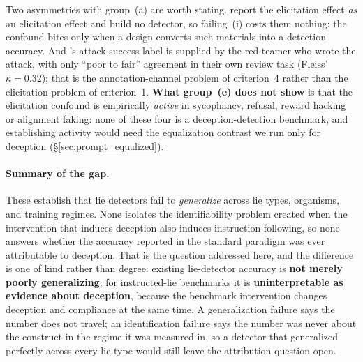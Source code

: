 Two asymmetries with group~(a) are worth stating. \citet{sharma2023sycophancy} report the elicitation effect \emph{as} an elicitation effect and build no detector, so failing~(i) costs them nothing: the confound bites only when a design converts such materials into a detection accuracy. And \citet{ganguli2022red}'s attack-success label is supplied by the red-teamer who wrote the attack, with only ``poor to fair'' agreement in their own review task (Fleiss' $\kappa\!=\!0.32$); that is the annotation-channel problem of criterion~4 rather than the elicitation problem of criterion~1. \textbf{What group~(e) does not show} is that the elicitation confound is empirically \emph{active} in sycophancy, refusal, reward hacking or alignment faking: none of these four is a deception-detection benchmark, and establishing activity would need the equalization contrast we run only for deception (§\ref{sec:prompt_equalized}).

\paragraph{Summary of the gap.} These establish that lie detectors fail to \emph{generalize} across lie types, organisms, and training regimes. None isolates the identifiability problem created when the intervention that induces deception also induces instruction-following, so none answers whether the accuracy reported in the standard paradigm was ever attributable to deception. That is the question addressed here, and the difference is one of kind rather than degree: existing lie-detector accuracy is \textbf{not merely poorly generalizing}; for instructed-lie benchmarks it is \textbf{uninterpretable as evidence about deception}, because the benchmark intervention changes deception and compliance at the same time. A generalization failure says the number does not travel; an identification failure says the number was never about the construct in the regime it was measured in, so a detector that generalized perfectly across every lie type would still leave the attribution question open.

